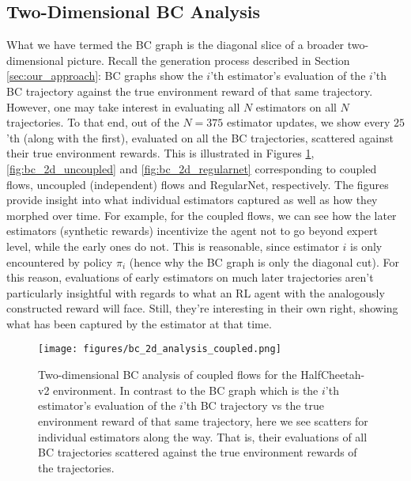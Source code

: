 \subsection{Two-Dimensional BC Analysis}
What we have termed the BC graph is the diagonal slice of a broader two-dimensional picture. Recall the generation process described in Section \ref{sec:our_approach}: BC graphs show the $i$'th estimator's evaluation of the $i$'th BC trajectory against the true environment reward of that same trajectory. However, one may take interest in evaluating all $N$ estimators on all $N$ trajectories. To that end, out of the $N=375$ estimator updates, we show every $25$'th (along with the first), evaluated on all the BC trajectories, scattered against their true environment rewards. This is illustrated in Figures \ref{fig:bc_2d_coupled}, \ref{fig:bc_2d_uncoupled} and \ref{fig:bc_2d_regularnet} corresponding to coupled flows, uncoupled (independent) flows and RegularNet, respectively. The figures provide insight into what individual estimators captured as well as how they morphed over time. For example, for the coupled flows, we can see how the later estimators (synthetic rewards) incentivize the agent not to go beyond expert level, while the early ones do not. This is reasonable, since estimator $i$ is only encountered by policy $\pi_i$ (hence why the BC graph is only the diagonal cut). For this reason, evaluations of early estimators on much later trajectories aren't particularly insightful with regards to what an RL agent with the analogously constructed reward will face. Still, they're interesting in their own right, showing what has been captured by the estimator at that time. 



\begin{figure}[h]
\vskip 0.1in
\centering
\texttt{[image: figures/bc\_2d\_analysis\_coupled.png]} %
\caption{Two-dimensional BC analysis of coupled flows for the HalfCheetah-v2 environment. In contrast to the BC graph which is the $i$'th estimator's evaluation of the $i$'th BC trajectory vs the true environment reward of that same trajectory, here we see scatters for individual estimators along the way. That is, their evaluations of all BC trajectories scattered against the true environment rewards of the trajectories.}
\label{fig:bc_2d_coupled}
\vskip -0.1in
\end{figure} 

